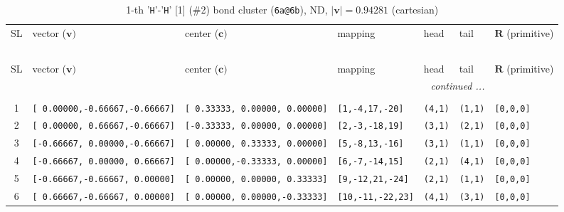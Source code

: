 \documentclass[fleqn,10pt,landscape]{jsarticle}
\begin{document}
\begin{longtable}[l]{cllllll}
\captionsetup{justification=raggedright, singlelinecheck=off}
\caption{1-th '\texttt{H}'-'\texttt{H}' [1] (\#2) bond cluster (\texttt{6a@6b}), ND, $|\bm{v}|=0.94281$ (cartesian)}
 \\
 \hline \hline
SL & vector ($\bm{v})$ & center ($\bm{c})$ & mapping & head & tail & $\bm{R}$ (primitive) \\ \hline \endfirsthead

\multicolumn{6}{l}{\tablename\ \thetable{}} \\
 \hline \hline
SL & vector ($\bm{v})$ & center ($\bm{c})$ & mapping & head & tail & $\bm{R}$ (primitive) \\ \hline \endhead

 \hline \hline
\multicolumn{6}{r}{\footnotesize\it continued ...} \\ \endfoot

 \hline \hline
\multicolumn{6}{r}{} \\ \endlastfoot

1 & \texttt{[ 0.00000,-0.66667,-0.66667]} & \texttt{[ 0.33333, 0.00000, 0.00000]} & \texttt{[1,-4,17,-20]} & \texttt{(4,1)} & \texttt{(1,1)} & \texttt{[0,0,0]} \\ \hline
2 & \texttt{[ 0.00000, 0.66667,-0.66667]} & \texttt{[-0.33333, 0.00000, 0.00000]} & \texttt{[2,-3,-18,19]} & \texttt{(3,1)} & \texttt{(2,1)} & \texttt{[0,0,0]} \\ \hline
3 & \texttt{[-0.66667, 0.00000,-0.66667]} & \texttt{[ 0.00000, 0.33333, 0.00000]} & \texttt{[5,-8,13,-16]} & \texttt{(3,1)} & \texttt{(1,1)} & \texttt{[0,0,0]} \\ \hline
4 & \texttt{[-0.66667, 0.00000, 0.66667]} & \texttt{[ 0.00000,-0.33333, 0.00000]} & \texttt{[6,-7,-14,15]} & \texttt{(2,1)} & \texttt{(4,1)} & \texttt{[0,0,0]} \\ \hline
5 & \texttt{[-0.66667,-0.66667, 0.00000]} & \texttt{[ 0.00000, 0.00000, 0.33333]} & \texttt{[9,-12,21,-24]} & \texttt{(2,1)} & \texttt{(1,1)} & \texttt{[0,0,0]} \\ \hline
6 & \texttt{[ 0.66667,-0.66667, 0.00000]} & \texttt{[ 0.00000, 0.00000,-0.33333]} & \texttt{[10,-11,-22,23]} & \texttt{(4,1)} & \texttt{(3,1)} & \texttt{[0,0,0]} \\
\end{longtable}
\end{document}
